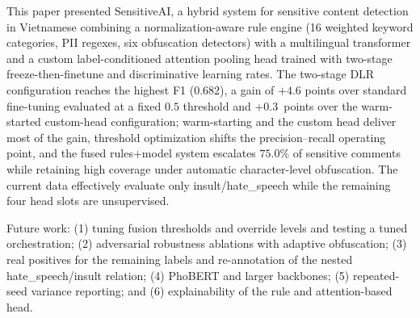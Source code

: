 \documentclass[runningheads]{llncs}
\begin{document}
This paper presented SensitiveAI, a hybrid system for sensitive content detection in Vietnamese combining a normalization-aware rule engine (16 weighted keyword categories, PII regexes, six obfuscation detectors) with a multilingual transformer and a custom label-conditioned attention pooling head trained with two-stage freeze-then-finetune and discriminative learning rates. The two-stage DLR configuration reaches the highest F1 (0.682), a gain of $+4.6$ points over standard fine-tuning evaluated at a fixed $0.5$ threshold and $+0.3$~points over the warm-started custom-head configuration; warm-starting and the custom head deliver most of the gain, threshold optimization shifts the precision--recall operating point, and the fused rules+model system escalates $75.0\%$ of sensitive comments while retaining high coverage under automatic character-level obfuscation. The current data effectively evaluate only insult/hate\_speech while the remaining four head slots are unsupervised.

Future work: (1) tuning fusion thresholds and override levels and testing a tuned orchestration; (2) adversarial robustness ablations with adaptive obfuscation; (3) real positives for the remaining labels and re-annotation of the nested hate\_speech/insult relation; (4) PhoBERT and larger backbones; (5) repeated-seed variance reporting; and (6) explainability of the rule and attention-based head.
\end{document}
